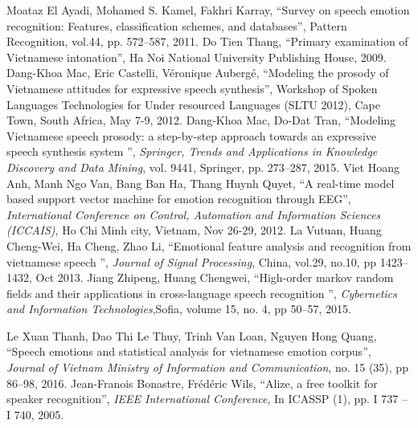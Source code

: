 \documentclass[a4paper,12pt]{article}
\begin{document}
\begin{thebibliography}{20}
 Moataz El Ayadi, Mohamed S. Kamel, Fakhri Karray, “Survey on speech emotion recognition:
Features, classification schemes, and databases”, Pattern Recognition, vol.44, pp. 572–587, 2011.
 Do Tien Thang, “Primary examination of Vietnamese intonation”, Ha Noi National University
Publishing House, 2009.
 Dang-Khoa Mac, Eric Castelli, V\'eronique Auberg\'e, “Modeling the prosody of Vietnamese attitudes for expressive speech synthesis”, Workshop of Spoken Languages Technologies for Under resourced Languages (SLTU 2012), Cape Town, South Africa, May 7-9, 2012.
Dang-Khoa Mac, Do-Dat Tran, “Modeling Vietnamese speech prosody: a step-by-step approach
towards an expressive speech synthesis system ”, \textit{Springer, Trends and Applications in Knowledge Discovery and Data Mining}, vol. 9441, Springer, pp. 273–287, 2015.
 Viet Hoang Anh, Manh Ngo Van, Bang Ban Ha, Thang Huynh Quyet, “A real-time model based
support vector machine for emotion recognition through EEG”, \textit{International Conference on
Control, Automation and Information Sciences (ICCAIS)}, Ho Chi Minh city, Vietnam, Nov
26-29, 2012.
 La Vutuan, Huang Cheng-Wei, Ha Cheng, Zhao Li, “Emotional feature analysis and recognition
from vietnamese speech ”, \textit{Journal of Signal Processing}, China, vol.29, no.10, pp 1423–1432,
Oct 2013.
Jiang Zhipeng, Huang Chengwei, “High-order markov random fields and their applications in
cross-language speech recognition ”, \textit{Cybernetics and Information Technologies},Sofia, volume
15, no. 4, pp 50–57, 2015.

Le Xuan Thanh, Dao Thi Le Thuy, Trinh Van Loan, Nguyen Hong Quang, “Speech emotions
and statistical analysis for vietnamese emotion corpus”, \textit{Journal of Vietnam Ministry of Information and Communication}, no. 15 (35), pp 86–98, 2016.
Jean-Franois Bonastre, Fr\'ed\'eric Wils, “Alize, a free toolkit for speaker recognition”, \textit{IEEE
International Conference}, In ICASSP (1), pp. I 737 – I 740, 2005.


\end{thebibliography}
\end{document}
